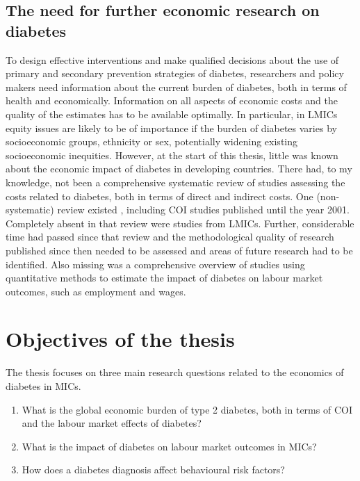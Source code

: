 \subsection{The need for further economic research on diabetes}

To design effective interventions and make qualified decisions about the use of primary and secondary prevention strategies of diabetes, researchers and policy makers need information about the current burden of diabetes, both in terms of health and economically. Information on all aspects of economic costs and the quality of the estimates has to be available optimally. In particular, in \acp{LMIC} equity issues are likely to be of importance if the burden of diabetes varies by socioeconomic groups, ethnicity or sex, potentially widening existing socioeconomic inequities. However, at the start of this thesis, little was known about the economic impact of diabetes in developing countries. There had, to my knowledge, not been a comprehensive systematic review of studies assessing the costs related to diabetes, both in terms of direct and indirect costs. One (non-systematic) review existed \parencite{Ettaro2004}, including \ac{COI} studies published until the year 2001. Completely absent in that review were studies from \acp{LMIC}. Further, considerable time had passed since that review and the methodological quality of research published since then needed to be assessed and areas of future research had to be identified. Also missing was a comprehensive overview of studies using quantitative methods to estimate the impact of diabetes on labour market outcomes, such as employment and wages.



\section{Objectives of the thesis}

The thesis focuses on three main research questions related to the economics of diabetes in \acp{MIC}. 

\begin{enumerate}
\item What is the global economic burden of type 2 diabetes, both in terms of \ac{COI} and the labour market effects of diabetes? 

\item What is the impact of diabetes on labour market outcomes in \acp{MIC}?

\item How does a diabetes diagnosis affect behavioural risk factors?

\end{enumerate}

